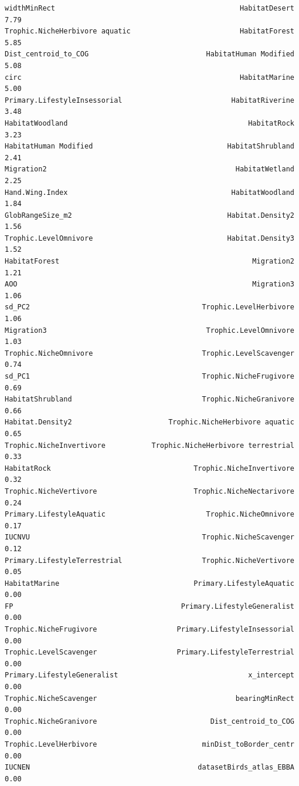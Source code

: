 \documentclass[
  letterpaper,
  DIV=11,
  numbers=noendperiod]{scrreprt}
\begin{document}
\begin{verbatim}
widthMinRect                                            HabitatDesert    7.79
Trophic.NicheHerbivore aquatic                          HabitatForest    5.85
Dist_centroid_to_COG                            HabitatHuman Modified    5.08
circ                                                    HabitatMarine    5.00
Primary.LifestyleInsessorial                          HabitatRiverine    3.48
HabitatWoodland                                           HabitatRock    3.23
HabitatHuman Modified                                HabitatShrubland    2.41
Migration2                                             HabitatWetland    2.25
Hand.Wing.Index                                       HabitatWoodland    1.84
GlobRangeSize_m2                                     Habitat.Density2    1.56
Trophic.LevelOmnivore                                Habitat.Density3    1.52
HabitatForest                                              Migration2    1.21
AOO                                                        Migration3    1.06
sd_PC2                                         Trophic.LevelHerbivore    1.06
Migration3                                      Trophic.LevelOmnivore    1.03
Trophic.NicheOmnivore                          Trophic.LevelScavenger    0.74
sd_PC1                                         Trophic.NicheFrugivore    0.69
HabitatShrubland                               Trophic.NicheGranivore    0.66
Habitat.Density2                       Trophic.NicheHerbivore aquatic    0.65
Trophic.NicheInvertivore           Trophic.NicheHerbivore terrestrial    0.33
HabitatRock                                  Trophic.NicheInvertivore    0.32
Trophic.NicheVertivore                       Trophic.NicheNectarivore    0.24
Primary.LifestyleAquatic                        Trophic.NicheOmnivore    0.17
IUCNVU                                         Trophic.NicheScavenger    0.12
Primary.LifestyleTerrestrial                   Trophic.NicheVertivore    0.05
HabitatMarine                                Primary.LifestyleAquatic    0.00
FP                                        Primary.LifestyleGeneralist    0.00
Trophic.NicheFrugivore                   Primary.LifestyleInsessorial    0.00
Trophic.LevelScavenger                   Primary.LifestyleTerrestrial    0.00
Primary.LifestyleGeneralist                               x_intercept    0.00
Trophic.NicheScavenger                                 bearingMinRect    0.00
Trophic.NicheGranivore                           Dist_centroid_to_COG    0.00
Trophic.LevelHerbivore                         minDist_toBorder_centr    0.00
IUCNEN                                        datasetBirds_atlas_EBBA    0.00

\end{verbatim}
\end{document}
